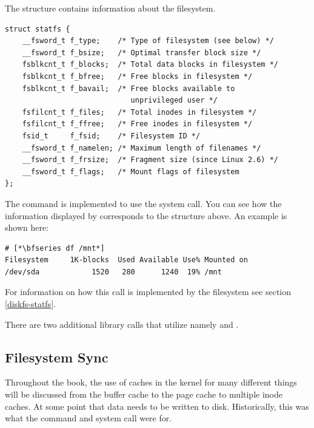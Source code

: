 \noindent
The  structure contains information about the filesystem.

\begin{lstlisting}
struct statfs {
    __fsword_t f_type;    /* Type of filesystem (see below) */
    __fsword_t f_bsize;   /* Optimal transfer block size */
    fsblkcnt_t f_blocks;  /* Total data blocks in filesystem */
    fsblkcnt_t f_bfree;   /* Free blocks in filesystem */
    fsblkcnt_t f_bavail;  /* Free blocks available to 
                             unprivileged user */
    fsfilcnt_t f_files;   /* Total inodes in filesystem */
    fsfilcnt_t f_ffree;   /* Free inodes in filesystem */
    fsid_t     f_fsid;    /* Filesystem ID */
    __fsword_t f_namelen; /* Maximum length of filenames */
    __fsword_t f_frsize;  /* Fragment size (since Linux 2.6) */
    __fsword_t f_flags;   /* Mount flags of filesystem
};
\end{lstlisting}

\noindent
The  command is implemented to use the  system call. You can see how the information displayed by  corresponds to the  structure above. An example is shown here:

\begin{lstlisting}
# [*\bfseries df /mnt*]
Filesystem     1K-blocks  Used Available Use% Mounted on
/dev/sda            1520   280      1240  19% /mnt
\end{lstlisting}

\noindent
For information on how this call is implemented by the filesystem see section \ref{diskfs-statfs}.

There are two additional library calls that utilize  namely  and .


\subsection{Filesystem Sync}

Throughout the book, the use of caches in the kernel for many different things will be discussed from the buffer cache to the page cache to multiple inode caches. At some point that data needs to be written to disk. Historically, this was what the  command and  system call were for.

